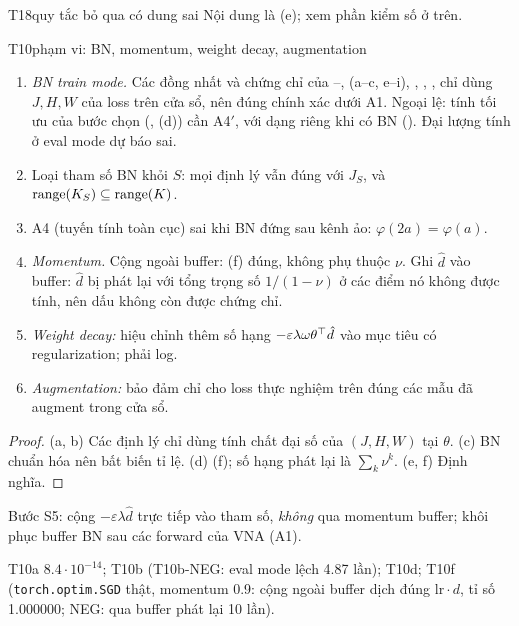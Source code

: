 \begin{namedthm}{T18}{quy tắc bỏ qua có dung sai}
Nội dung là (e); xem phần kiểm số ở trên.
\end{namedthm}

\begin{namedthm}{T10}{phạm vi: BN, momentum, weight decay, augmentation}
\begin{enumerate}[label=(\alph*)]
\item \emph{BN train mode.} Các đồng nhất và chứng chỉ của --, (a--c, e--i), , , ,  chỉ dùng $J,H,W$ của loss trên cửa sổ, nên đúng chính xác dưới A1. Ngoại lệ: tính tối ưu của bước chọn (, (d)) cần A4$'$, với dạng riêng khi có BN (). Đại lượng tính ở eval mode dự báo sai.
\item Loại tham số BN khỏi $S$: mọi định lý vẫn đúng với $J_S$, và $\operatorname{range}(K_S)\subseteq\operatorname{range}(K)$.
\item A4 (tuyến tính toàn cục) sai khi BN đứng sau kênh ảo: $\varphi(2a)=\varphi(a)$.
\item \emph{Momentum.} Cộng ngoài buffer: (f) đúng, không phụ thuộc $\nu$. Ghi $\hat d$ vào buffer: $\hat d$ bị phát lại với tổng trọng số $1/(1-\nu)$ ở các điểm nó không được tính, nên dấu không còn được chứng chỉ.
\item \emph{Weight decay:} hiệu chỉnh thêm số hạng $-\varepsilon\lambda\omega\theta^{\top}\hat d$ vào mục tiêu có regularization; phải log.
\item \emph{Augmentation:} bảo đảm chỉ cho loss thực nghiệm trên đúng các mẫu đã augment trong cửa sổ.
\end{enumerate}
\end{namedthm}
\begin{proof}
(a, b) Các định lý chỉ dùng tính chất đại số của $(J,H,W)$ tại $\theta$. (c) BN chuẩn hóa nên bất biến tỉ lệ. (d) (f); số hạng phát lại là $\sum_k\nu^k$. (e, f) Định nghĩa.
\end{proof}
\begin{hequa}
Bước S5: cộng $-\varepsilon\lambda\hat d$ trực tiếp vào tham số, \emph{không} qua momentum buffer; khôi phục buffer BN sau các forward của VNA (A1).
\end{hequa}
\begin{kiem}
T10a $8.4\cdot10^{-14}$; T10b (T10b-NEG: eval mode lệch 4.87 lần); T10d; T10f (\texttt{torch.optim.SGD} thật, momentum 0.9: cộng ngoài buffer dịch đúng $\mathrm{lr}\cdot d$, tỉ số 1.000000; NEG: qua buffer phát lại 10 lần).
\end{kiem}

